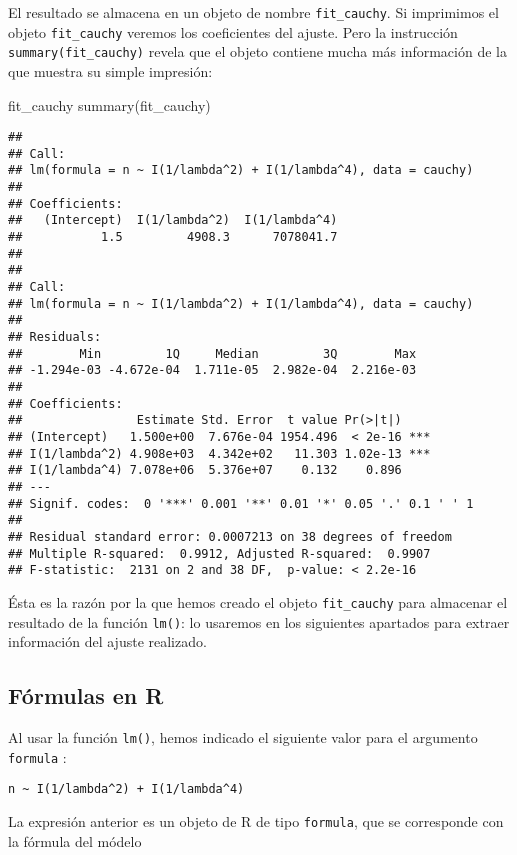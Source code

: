 \documentclass[
  degree=mecinf,
  title=normal,
  toc=normal,
  bib=normal]{mnye}
\newenvironment{Shaded}{\begin{snugshade}}{\end{snugshade}}
\newcommand{\FunctionTok}[1]{\textcolor[rgb]{0.00,0.00,0.00}{#1}}
\newcommand{\NormalTok}[1]{#1}
\begin{document}
El resultado se almacena en un objeto de nombre \texttt{fit\_cauchy}.
Si imprimimos el objeto \texttt{fit\_cauchy} veremos los coeficientes del ajuste. Pero la instrucción \texttt{summary(fit\_cauchy)} revela que el objeto contiene mucha más información de la que muestra su simple impresión:

\begin{Shaded}
\begin{Highlighting}[]
\NormalTok{fit\_cauchy}
\FunctionTok{summary}\NormalTok{(fit\_cauchy)}
\end{Highlighting}
\end{Shaded}

\begin{verbatim}
## 
## Call:
## lm(formula = n ~ I(1/lambda^2) + I(1/lambda^4), data = cauchy)
## 
## Coefficients:
##   (Intercept)  I(1/lambda^2)  I(1/lambda^4)  
##           1.5         4908.3      7078041.7  
## 
## 
## Call:
## lm(formula = n ~ I(1/lambda^2) + I(1/lambda^4), data = cauchy)
## 
## Residuals:
##        Min         1Q     Median         3Q        Max 
## -1.294e-03 -4.672e-04  1.711e-05  2.982e-04  2.216e-03 
## 
## Coefficients:
##                Estimate Std. Error  t value Pr(>|t|)    
## (Intercept)   1.500e+00  7.676e-04 1954.496  < 2e-16 ***
## I(1/lambda^2) 4.908e+03  4.342e+02   11.303 1.02e-13 ***
## I(1/lambda^4) 7.078e+06  5.376e+07    0.132    0.896    
## ---
## Signif. codes:  0 '***' 0.001 '**' 0.01 '*' 0.05 '.' 0.1 ' ' 1
## 
## Residual standard error: 0.0007213 on 38 degrees of freedom
## Multiple R-squared:  0.9912, Adjusted R-squared:  0.9907 
## F-statistic:  2131 on 2 and 38 DF,  p-value: < 2.2e-16
\end{verbatim}

Ésta es la razón por la que hemos creado el objeto \texttt{fit\_cauchy} para almacenar el resultado de la función \texttt{lm()}: lo usaremos en los siguientes apartados para extraer información del ajuste realizado.

\hypertarget{fuxf3rmulas-en-r}{%
\subsection{Fórmulas en R}\label{fuxf3rmulas-en-r}}

Al usar la función \texttt{lm()}, hemos indicado el siguiente valor para el argumento \texttt{formula} :

\texttt{n\ \textasciitilde{}\ I(1/lambda\^{}2)\ +\ I(1/lambda\^{}4)}

La expresión anterior es un objeto de \textsf{R} de tipo \texttt{formula}, que se corresponde con la fórmula del módelo
\end{document}

